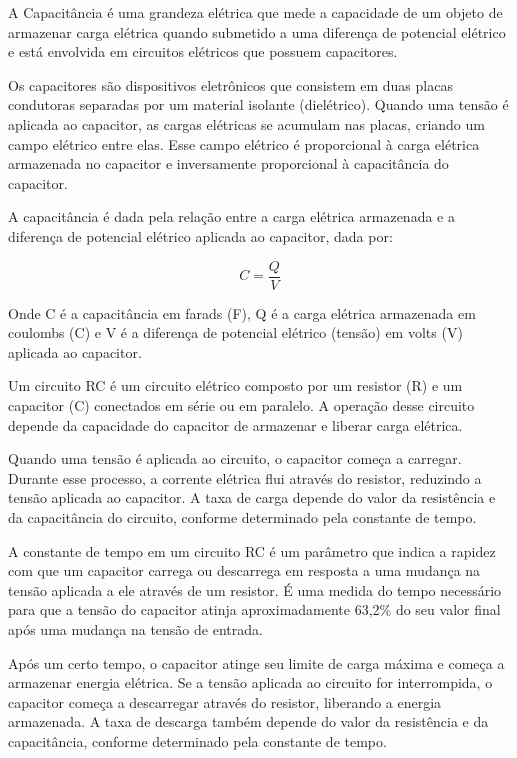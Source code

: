 \documentclass[11pt,a4paper]{article}
\begin{document}
			A Capacitância é uma grandeza elétrica que mede a capacidade de um objeto de armazenar carga elétrica quando submetido a uma diferença de potencial elétrico e está envolvida em circuitos elétricos que possuem capacitores.
			
			Os capacitores são dispositivos eletrônicos que consistem em duas placas condutoras separadas por um material isolante (dielétrico). Quando uma tensão é aplicada ao capacitor, as cargas elétricas se acumulam nas placas, criando um campo elétrico entre elas. Esse campo elétrico é proporcional à carga elétrica armazenada no capacitor e inversamente proporcional à capacitância do capacitor.

			A capacitância é dada pela relação entre a carga elétrica armazenada e a diferença de potencial elétrico aplicada ao capacitor, dada por:

				\begin{equation}
					C = \frac{Q}{V}
				\end{equation}

			\noindent Onde C é a capacitância em farads (F), Q é a carga elétrica armazenada em coulombs (C) e V é a diferença de potencial elétrico (tensão) em volts (V) aplicada ao capacitor.
			
			Um circuito RC é um circuito elétrico composto por um resistor (R) e um capacitor (C) conectados em série ou em paralelo. A operação desse circuito depende da capacidade do capacitor de armazenar e liberar carga elétrica.

			Quando uma tensão é aplicada ao circuito, o capacitor começa a carregar. Durante esse processo, a corrente elétrica flui através do resistor, reduzindo a tensão aplicada ao capacitor. A taxa de carga depende do valor da resistência e da capacitância do circuito, conforme determinado pela constante de tempo.

			A constante de tempo em um circuito RC é um parâmetro que indica a rapidez com que um capacitor carrega ou descarrega em resposta a uma mudança na tensão aplicada a ele através de um resistor. É uma medida do tempo necessário para que a tensão do capacitor atinja aproximadamente 63,2\% do seu valor final após uma mudança na tensão de entrada.

			Após um certo tempo, o capacitor atinge seu limite de carga máxima e começa a armazenar energia elétrica. Se a tensão aplicada ao circuito for interrompida, o capacitor começa a descarregar através do resistor, liberando a energia armazenada. A taxa de descarga também depende do valor da resistência e da capacitância, conforme determinado pela constante de tempo.
			
\end{document}

